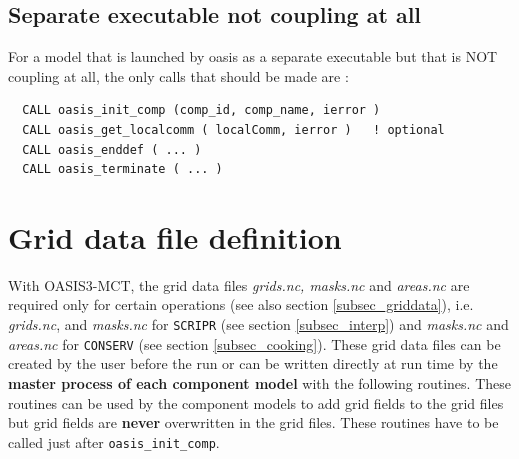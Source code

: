 \subsection{Separate executable not coupling at all}
\label{subsec_nocpl}

For a model that is launched by oasis as a separate executable but that is NOT coupling at all, 
the only calls that should be made are :

\begin{verbatim}
  CALL oasis_init_comp (comp_id, comp_name, ierror )
  CALL oasis_get_localcomm ( localComm, ierror )   ! optional
  CALL oasis_enddef ( ... )
  CALL oasis_terminate ( ... )
\end{verbatim}

\section{Grid data file definition}
\label{subsubsec_griddef}

With OASIS3-MCT, the grid data files {\em grids.nc, masks.nc} and {\em
  areas.nc} are required only for certain operations (see also
section \ref{subsec_griddata}), i.e.  {\em grids.nc}, and {\em
  masks.nc} for {\tt SCRIPR} (see section
\ref{subsec_interp}) and {\em masks.nc} and {\em areas.nc} 
for {\tt CONSERV} (see section \ref{subsec_cooking}). These grid data files can be
created by the user before the run or can be written directly at run
time by the {\bf master process of each component model} with the following
routines.  These routines can be used by the component models to add
grid fields to the grid files but grid fields
are {\bf never} overwritten in the grid files. These routines have to
be called just after {\tt oasis\_init\_comp}. 


